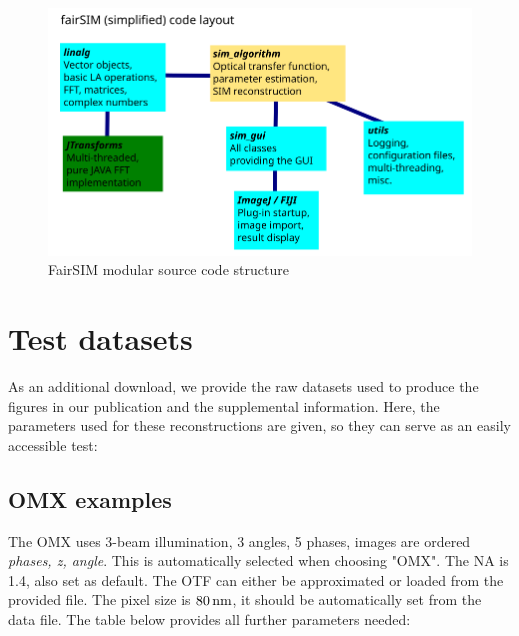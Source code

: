 \documentclass[twoside=false,
           twocolumn=false,
           a4paper,DIV=15,
           10pt]{scrartcl}
\begin{document}
\begin{figure}[ht]
\begin{center}
\includegraphics[width=.7\textwidth]{../figures/SketchCodeDiagramm}
\end{center}
\caption{FairSIM modular source code structure}
\label{sup-fig-code}
\end{figure}




\clearpage

\section{Test datasets}

As an additional download, we provide the raw
datasets used to produce the figures in our
publication and the supplemental information.
Here, the parameters used for these reconstructions
are given, so they can serve as an easily accessible
test:

\subsection{OMX examples}

The OMX uses 3-beam illumination, 3 angles, 5 phases,
images are ordered \emph{phases, z, angle}. This is
automatically selected when choosing "OMX". The NA is 1.4,
also set as default. The OTF can either be approximated
or loaded from the provided file. 
The pixel size is $\unit[80]{nm}$,
it should be automatically set from the data file.
The table below provides all further
parameters needed:
\vspace{1em}
\end{document}

